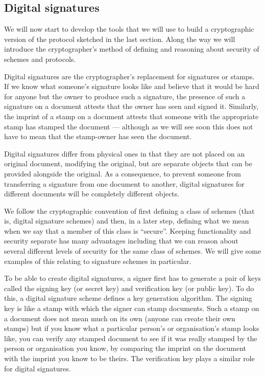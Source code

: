 \documentclass[envcountsame]{llncs}
\begin{document}
\subsection{Digital signatures}

We will now start to develop the tools that we will use to build a cryptographic
version of the protocol sketched in the last section. Along the way we will
introduce the cryptographer's method of defining and reasoning about security of
schemes and protocols.

Digital signatures are the cryptographer's replacement for signatures or stamps.
If we know what someone's signature looks like and believe that it would be hard
for anyone but the owner to produce such a signature, the presence of such a
signature on a document attests that the owner has seen and signed it.
Similarly, the imprint of a stamp on a document attests that someone with the
appropriate stamp has stamped the document --- although as we will see soon this
does not have to mean that the stamp-owner has seen the document.

Digital signatures differ from physical ones in that they are not placed on an
original document, modifying the original, but are separate objects that can be
provided alongside the original. As a consequence, to prevent someone from
transferring a signature from one document to another, digital signatures for
different documents will be completely different objects.

We follow the cryptographic convention of first defining a class of schemes
(that is, digital signature schemes) and then, in a later step, defining what we
mean when we say that a member of this class is ``secure''. Keeping
functionality and security separate has many advantages including that we can
reason about several different levels of security for the same class of schemes.
We will give some examples of this relating to signature schemes in particular.

To be able to create digital signatures, a signer first has to generate a pair
of keys called the signing key (or secret key) and verification key (or public
key). To do this, a digital signature scheme defines a key generation algorithm.
The signing key is like a stamp with which the signer can stamp documents. Such
a stamp on a document does not mean much on its own (anyone can create their own
stamps) but if you know what a particular person's or organisation's stamp looks
like, you can verify any stamped document to see if it was really stamped by the
person or organisation you know, by comparing the imprint on the document with
the imprint you know to be theirs. The verification key plays a similar role for
digital signatures.
\end{document}
